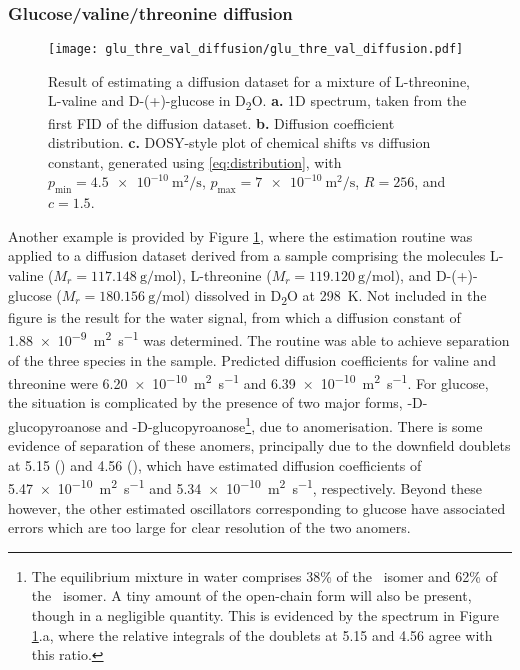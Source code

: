 \subsubsection{Glucose/valine/threonine diffusion}
\begin{figure}
    \centering
    \texttt{[image: glu\_thre\_val\_diffusion/glu\_thre\_val\_diffusion.pdf]}
    \caption[
        Result of estimating a diffusion dataset for a mixture of L-threonine,
        L-valine and D-(+)-glucose.
    ]{
        Result of estimating a diffusion dataset for a mixture of L-threonine,
        L-valine and D-(+)-glucose in D\textsubscript{2}O.
        \textbf{a.} \acs{1D} spectrum, taken from the first \acs{FID} of the
        diffusion dataset.
        \textbf{b.} Diffusion coefficient distribution.
        \textbf{c.} \acs{DOSY}-style plot of chemical shifts vs diffusion
        constant, generated using \eqref{eq:distribution}, with
        $p_{\text{min}} = \qty{4.5e-10}{\meter\squared\per\second}$,
        $p_{\text{max}} = \qty{7e-10}{\meter\squared\per\second}$,
        $R=256$, and $c=1.5$.
    }
    \label{fig:gluc_val_thre}
\end{figure}
Another example is provided by Figure \ref{fig:gluc_val_thre}, where the
estimation routine was applied to a diffusion dataset derived from a sample
comprising the molecules
L-valine ($M_r = \qty{117.148}{\gram\per\mole}$),
L-threonine ($M_r = \qty{119.120}{\gram\per\mole}$),
and D-(+)-glucose ($M_r = \qty{180.156}{\gram\per\mole})$ dissolved in
D\textsubscript{2}O at \qty{298}{\kelvin}. Not included in the figure is the
result for the water
signal, from which a diffusion constant of
\qty{1.88e-9}{\meter\squared\per\second} was determined. The routine was able
to achieve separation of the three species in the sample. Predicted diffusion
coefficients for valine and threonine were
\qty{6.20e-10}{\meter\squared\per\second} and
\qty{6.39e-10}{\meter\squared\per\second}. For glucose, the situation is
complicated by the presence of two major forms, \textalpha-D-glucopyroanose and
\textbeta-D-glucopyroanose\footnote{
    The equilibrium mixture in water comprises 38\% of the \textalpha\ isomer
    and 62\% of the \textbeta\ isomer. A tiny amount of the open-chain form will
    also be present, though in a negligible quantity. This is evidenced by the
    spectrum in Figure \ref{fig:gluc_val_thre}.a, where the relative integrals of
    the doublets at \qty{5.15}{\partspermillion} and
    \qty{4.56}{\partspermillion} agree with this ratio.
}, due to anomerisation\cite[Chapter 3]{Davis2002}.
There is some evidence of separation of these anomers, principally due
to the downfield doublets at \qty{5.15}{\partspermillion} (\textalpha) and
\qty{4.56}{\partspermillion} (\textbeta), which have estimated diffusion
coefficients of \qty{5.47e-10}{\meter\squared\per\second}
and \qty{5.34e-10}{\meter\squared\per\second}, respectively. Beyond these
however, the other estimated oscillators corresponding to glucose have
associated errors which are too large for clear resolution of the two anomers.

